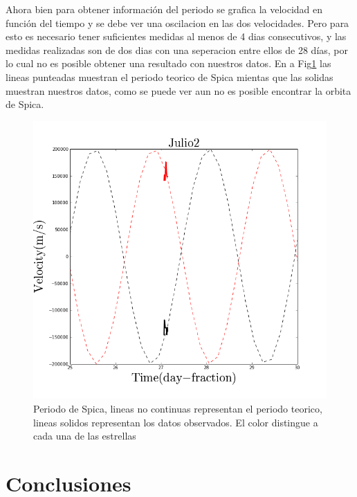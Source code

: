 \documentclass[Proceedings]{ascelike}
\begin{document}
Ahora bien para obtener informaci\'on del periodo se grafica la velocidad en funci\'on del tiempo y se debe ver una oscilacion en las dos velocidades. Pero para esto es necesario tener suficientes medidas al menos de 4 dias consecutivos, y las medidas realizadas son de dos dias con una seperacion entre ellos de 28 d\'ias, por lo cual no es posible obtener una resultado con nuestros datos. En a Fig\ref{pS} las lineas punteadas muestran el periodo teorico de Spica mientas que las solidas muestran nuestros datos, como se puede ver aun no es posible encontrar la orbita de Spica.

\begin{figure}
\includegraphics[scale=0.5]{periodoSpica.png}
\caption{Periodo de Spica, lineas no continuas representan el periodo teorico, lineas solidos representan los datos observados. El color distingue a cada una de las estrellas \label{pS}}
\end{figure}


\section{Conclusiones}
\end{document}
